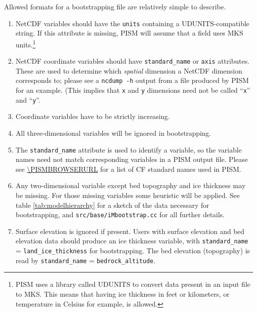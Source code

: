 \documentclass[titlepage,letterpaper,final]{scrartcl}
\begin{document}
Allowed formats for a bootstrapping file are relatively simple to describe. 
\begin{enumerate}
\item NetCDF variables should have the \texttt{units} containing a
  UDUNITS-compatible string. If this attribute is missing, PISM will assume
  that a field uses MKS units.\footnote{PISM uses a library called UDUNITS to convert data present in an input file to MKS.   This means that having ice thickness in feet or kilometers, or temperature in Celsius for example, is allowed.}
\item NetCDF coordinate variables should have \texttt{standard_name} or
  \texttt{axis} attributes. These are used to
  determine which \emph{spatial} dimension a NetCDF dimension corresponds to;
  please see a \texttt{ncdump -h} output from a file produced by PISM for an example. (This implies
  that \texttt{x} and \texttt{y} dimensions need not be called ``\texttt{x}''
  and ``\texttt{y}''.
\item Coordinate variables have to be strictly increasing.
\item All three-dimensional variables will be ignored in bootstrapping.
\item The \texttt{standard_name} attribute is used to identify a variable, so
  the variable names need not match corresponding variables in a
  PISM output file. Please see \url{\PISMBROWSERURL} for a list of CF standard
  names used in PISM.
\item Any two-dimensional variable except bed topography and ice thickness may
  be missing. For those missing variables some heuristic will be applied. See
  table \ref{tab:modelhierarchy} for a sketch of the data necessary for
  bootstrapping, and \texttt{src/base/iMbootstrap.cc} for all further details.
\item Surface elevation is ignored if present. Users with surface elevation and
  bed elevation data should produce an ice thickness variable, with
  \texttt{standard_name} = \texttt{land_ice_thickness} for bootstrapping. The
  bed elevation (topography) is read by \texttt{standard_name} =
  \texttt{bedrock_altitude}.
\end{enumerate}


\clearpage\newpage


\clearpage\newpage


\clearpage\newpage


\clearpage\newpage


\clearpage\newpage


\clearpage\newpage


\clearpage\newpage


\clearpage\newpage


\clearpage\newpage



{}
\label{sec:index}
\printindex

{}
\printindex[options]
\end{document}
